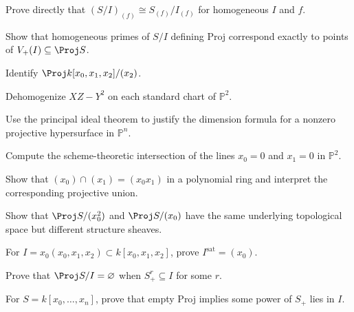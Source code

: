 \begin{exercise}\label{exr:vi37-01}
Prove directly that \((S/I)_{(f)}\cong S_{(f)}/I_{(f)}\) for homogeneous \(I\) and \(f\).
\end{exercise}
\begin{exercise}\label{exr:vi37-02}
Show that homogeneous primes of \(S/I\) defining Proj correspond exactly to points of \(V_+(I)\subseteq\Proj S\).
\end{exercise}
\begin{exercise}\label{exr:vi37-03}
Identify \(\Proj k[x_0,x_1,x_2]/(x_2)\).
\end{exercise}
\begin{exercise}\label{exr:vi37-04}
Dehomogenize \(XZ-Y^2\) on each standard chart of \(\mathbb P^2\).
\end{exercise}
\begin{exercise}\label{exr:vi37-05}
Use the principal ideal theorem to justify the dimension formula for a nonzero projective hypersurface in \(\mathbb P^n\).
\end{exercise}
\begin{exercise}\label{exr:vi37-06}
Compute the scheme-theoretic intersection of the lines \(x_0=0\) and \(x_1=0\) in \(\mathbb P^2\).
\end{exercise}
\begin{exercise}\label{exr:vi37-07}
Show that \((x_0)\cap(x_1)=(x_0x_1)\) in a polynomial ring and interpret the corresponding projective union.
\end{exercise}
\begin{exercise}\label{exr:vi37-08}
Show that \(\Proj S/(x_0^2)\) and \(\Proj S/(x_0)\) have the same underlying topological space but different structure sheaves.
\end{exercise}
\begin{exercise}\label{exr:vi37-09}
For \(I=x_0(x_0,x_1,x_2)\subset k[x_0,x_1,x_2]\), prove \(I^{\mathrm{sat}}=(x_0)\).
\end{exercise}
\begin{exercise}\label{exr:vi37-10}
Prove that \(\Proj S/I=\varnothing\) when \(S_+^r\subseteq I\) for some \(r\).
\end{exercise}
\begin{exercise}\label{exr:vi37-11}
For \(S=k[x_0,\ldots,x_n]\), prove that empty Proj implies some power of \(S_+\) lies in \(I\).
\end{exercise}
